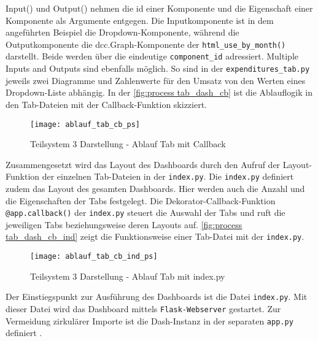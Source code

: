     Input() und Output() nehmen die id einer Komponente und die Eigenschaft einer Komponente als Argumente entgegen.
    Die Inputkomponente ist in dem angeführten Beispiel die Dropdown-Komponente, während die Outputkomponente die dcc.Graph-Komponente der
    \texttt{html\_use\_by\_month()} darstellt. Beide werden über die eindeutige \texttt{component\_id} adressiert.
    Multiple Inputs and Outputs sind ebenfalls möglich. So sind in der \texttt{expenditures\_tab.py}
    jeweils zwei Diagramme und Zahlenwerte für den Umsatz von den Werten eines Dropdown-Liste abhängig.
    In der \autoref{fig:process tab_dash_cb} ist die Ablauflogik in den Tab-Dateien mit der Callback-Funktion skizziert.

    \begin{figure}[H]
        \centering
            \texttt{[image: ablauf\_tab\_cb\_ps]}
            \caption{Teilsystem 3 Darstellung - Ablauf Tab mit Callback}
            \label{fig:process tab_dash_cb}
    \end{figure}


    Zusammengesetzt wird das Layout des Dashboards durch den Aufruf der Layout-Funktion der einzelnen Tab-Dateien in der \texttt{index.py}.
    Die \texttt{index.py} definiert zudem das Layout des gesamten Dashboards. Hier werden auch die Anzahl und die Eigenschaften der Tabs festgelegt. 
    Die Dekorator-Callback-Funktion \texttt{@app.callback()} der \texttt{index.py} steuert die Auswahl der Tabs und ruft die jeweiligen Tabs beziehungsweise deren 
    Layouts auf. \autoref{fig:process tab_dash_cb_ind} zeigt die Funktionsweise einer Tab-Datei mit der \texttt{index.py}.

    \begin{figure}[H]
        \centering
            \texttt{[image: ablauf\_tab\_cb\_ind\_ps]}
            \caption{Teilsystem 3 Darstellung - Ablauf Tab mit index.py}
            \label{fig:process tab_dash_cb_ind}
    \end{figure}

    Der Einstiegspunkt zur Ausführung des Dashboards ist die Datei \texttt{index.py}. Mit dieser Datei wird das Dashboard mittels \texttt{Flask-Webserver}
    gestartet. Zur Vermeidung zirkulärer Importe ist die Dash-Instanz in der separaten \texttt{app.py} definiert \cite[vgl.][]{plotly_url_2021}.


